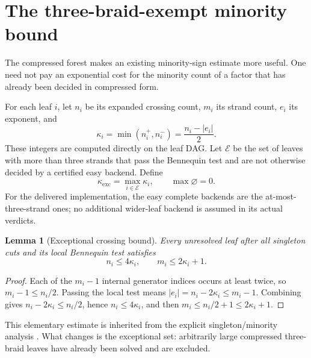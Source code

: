 \documentclass[11pt,letterpaper]{article}
\newtheorem{lemma}[theorem]{Lemma}
\theoremstyle{definition}\newtheorem{definition}[theorem]{Definition}
\theoremstyle{remark}\newtheorem{remark}[theorem]{Remark}
\newcommand{\exc}{\mathrm{exc}}
\begin{document}
\section{The three-braid-exempt minority bound}
The compressed forest makes an existing minority-sign estimate more useful. One need not pay an exponential cost for the minority count of a factor that has already been decided in compressed form.

For each leaf $i$, let $n_i$ be its expanded crossing count, $m_i$ its strand count, $e_i$ its exponent, and
\[
 \kappa_i=\min(n_i^+,n_i^-)=\frac{n_i-|e_i|}{2}.
\]
These integers are computed directly on the leaf DAG. Let $\mathcal E$ be the set of leaves with more than three strands that pass the Bennequin test and are not otherwise decided by a certified easy backend. Define
\[
 \kappa_{\exc}=\max_{i\in\mathcal E}\kappa_i,
 \qquad \max\varnothing=0.
\]
For the delivered implementation, the easy complete backends are the at-most-three-strand ones; no additional wider-leaf backend is assumed in its actual verdicts.

\begin{lemma}[Exceptional crossing bound]\label{lem:minority}
Every unresolved leaf after all singleton cuts and its local Bennequin test satisfies
\[
 n_i\le4\kappa_i,\qquad m_i\le2\kappa_i+1.
\]
\end{lemma}
\begin{proof}
Each of the $m_i-1$ internal generator indices occurs at least twice, so $m_i-1\le n_i/2$. Passing the local test means $|e_i|=n_i-2\kappa_i\le m_i-1$. Combining gives $n_i-2\kappa_i\le n_i/2$, hence $n_i\le4\kappa_i$, and then $m_i\le n_i/2+1\le2\kappa_i+1$.
\end{proof}
This elementary estimate is inherited from the explicit singleton/minority analysis \cite{minority}. What changes is the exceptional set: arbitrarily large compressed three-braid leaves have already been solved and are excluded.
\end{document}
